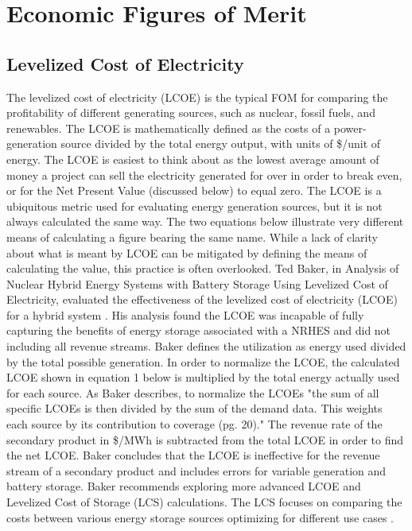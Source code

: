 \documentclass[12pt]{UIdahoMastersThesis}
\begin{document}
\section{Economic Figures of Merit}
\subsection{Levelized Cost of Electricity}
The levelized cost of electricity (LCOE) is the typical FOM for comparing the profitability of different generating sources, such as nuclear, fossil fuels, and renewables. The LCOE is mathematically defined as the costs of a power-generation source divided by the total energy output, with units of \$/unit of energy. The LCOE is easiest to think about as the lowest average amount of money a project can sell the electricity generated for over in order to break even, or for the Net Present Value (discussed below) to equal zero. The LCOE is a ubiquitous metric used for evaluating energy generation sources, but it is not always calculated the same way.  The two equations below illustrate very different means of calculating a figure bearing the same name.  While a lack of clarity about what is meant by LCOE can be mitigated by defining the means of calculating the value, this practice is often overlooked.
Ted Baker, in Analysis of Nuclear Hybrid Energy Systems with Battery Storage Using Levelized Cost of Electricity, evaluated the effectiveness of the levelized cost of electricity (LCOE) for a hybrid system \cite{Baker2016}. His analysis found the LCOE was incapable of fully capturing the benefits of energy storage associated with a NRHES and did not including all revenue streams.  Baker defines the utilization as energy used divided by the total possible generation. In order to normalize the LCOE, the calculated LCOE shown in equation 1 below is multiplied by the total energy actually used for each source.  As Baker describes, to normalize the LCOEs "the sum of all specific LCOEs is then divided by the sum of the demand data. This weights each source by its contribution to coverage (pg. 20)."  The revenue rate of the secondary product in \$/MWh is subtracted from the total LCOE in order to find the net LCOE.  Baker concludes that the LCOE is ineffective for the revenue stream of a secondary product and includes errors for variable generation and battery storage. Baker recommends exploring more advanced LCOE and Levelized Cost of Storage (LCS) calculations. The LCS focuses on comparing the costs between various energy storage sources optimizing for different use cases \cite{Tyskiewiczd}.
\end{document}
